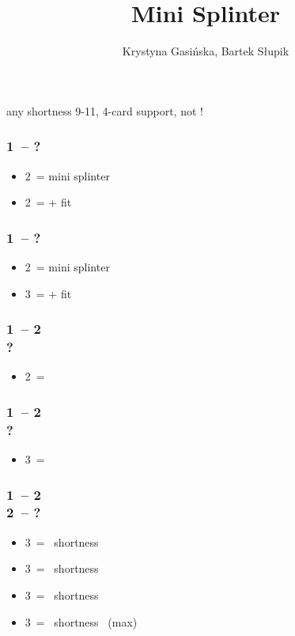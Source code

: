 \documentclass[12pt, a4paper]{article}
\title{Mini Splinter}
\author{Krystyna Gasińska, Bartek Słupik}
\begin{document}
\maketitle


any shortness 9-11, 4-card support, not \gf!

\subsubsection*{1\hearts\ -- ?}
\begin{itemize}
    \item 2\spades\ = mini splinter
    \item 2\nt\ = \inv + fit
\end{itemize}

\subsubsection*{1\spades\ -- ?}
\begin{itemize}
    \item 2\nt\ = mini splinter
    \item 3\hearts\ = \inv + fit
\end{itemize}

\subsubsection*{1\hearts\ -- 2\spades \\ ?}
\begin{itemize}
    \item 2\nt\ = \lsf
\end{itemize}

\subsubsection*{1\spades\ -- 2\nt \\ ?}
\begin{itemize}
    \item 3\clubs\ = \lsf
\end{itemize}

\subsubsection*{1\hearts\ -- 2\spades \\ 2\nt\ -- ?}
\begin{itemize}
    \item 3\clubs\ = \clubs\ shortness
    \item 3\diams\ = \diams\ shortness
    \item 3\hearts\ = \spades\ shortness
    \item 3\spades\ = \spades\ shortness \gf\ (max)
\end{itemize}
\end{document}
